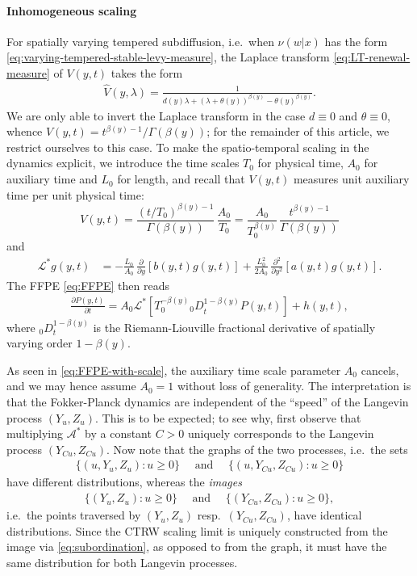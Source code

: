 \documentclass[a4paper,12pt]{elsarticle}
\numberwithin{equation}{section}
\theoremstyle{plain}
\theoremstyle{definition}
\theoremstyle{remark}
\numberwithin{equation}{section}
\newcommand{\1}{\mathbf 1}
\newcommand{\del}{\partial}
\begin{document}
\paragraph{Inhomogeneous scaling}
For spatially varying tempered subdiffusion, i.e.\ when $\nu(w|x)$ has the form 
\eqref{eq:varying-tempered-stable-levy-measure}, 
the Laplace transform \eqref{eq:LT-renewal-measure} of $V(y,t)$ takes the form
\begin{align}
\hat V(y,\lambda) =
\frac{1}{d(y) \lambda + (\lambda + \theta(y))^{\beta(y)} - \theta(y)^{\beta(y)}}.
\end{align}
We are only able to invert the Laplace transform in the case $d \equiv 0$ and
$\theta \equiv 0$, whence $V(y,t) = t^{\beta(y)-1} / \Gamma(\beta(y))$; 
for the remainder of this article, we restrict ourselves to this case.
To make the spatio-temporal scaling in the dynamics explicit, we introduce the time scales
$T_0$ for physical time, $A_0$ for auxiliary time and $L_0$ for length, 
and recall that $V(y,t)$ measures unit auxiliary time per unit physical 
time:
$$V(y,t) = \frac{(t/T_0)^{\beta(y)-1}}{\Gamma(\beta(y))}\, \frac{A_0}{T_0}
= \frac{A_0}{T_0^{\beta(y)}} \, \frac{t^{\beta(y) - 1}}{\Gamma(\beta(y))}$$
and
\begin{align}
\mathcal L^* g(y,t)
&= -\frac{L_0}{A_0}\,\frac{\partial }{\partial y}[b(y,t) g(y,t)]
+\frac{L_0^2}{2A_0}\,\frac{\partial^2 }{\partial y^2}[a(y,t) g(y,t)].
\end{align}
The FFPE \eqref{eq:FFPE} then reads
\begin{align} \label{eq:FFPE-with-scale}
\frac{\del P(y,t)}{\del t}
= A_0 \mathcal L^* \left[ T_0^{-\beta(y)} {_0 D}_t^{1-\beta(y)} P(y,t) \right] + h(y,t),
\end{align}
where $_0 D_t^{1-\beta(y)}$ is the Riemann-Liouville
fractional derivative of spatially varying order $1-\beta(y)$.

As seen in \eqref{eq:FFPE-with-scale}, the auxiliary time scale parameter $A_0$ cancels, and we may hence assume $A_0 = 1$ without loss of generality. The interpretation is that the
Fokker-Planck dynamics are independent of the ``speed'' of the Langevin process
$(Y_u, Z_u)$.  This is to be expected; to see why, first observe that
multiplying $\mathcal A^*$ by a constant $C > 0$ uniquely corresponds to the
Langevin process $(Y_{Cu}, Z_{Cu})$. 
Now note that the graphs of the two processes, i.e.\ the sets
\begin{align*}
\{(u, Y_u, Z_u): u \ge 0\} \quad \text{ and } \quad 
\{(u, Y_{Cu}, Z_{Cu}): u \ge 0\}
\end{align*}
have different distributions, whereas the \emph{images}
\begin{align*}
\{(Y_u, Z_u): u \ge 0\} \quad \text{ and } \quad 
\{(Y_{Cu}, Z_{Cu}): u \ge 0\},
\end{align*}
i.e.\ the points traversed by $(Y_u,Z_u)$ resp.\ $(Y_{Cu}, Z_{Cu})$, 
have identical distributions. 
Since the CTRW scaling limit is uniquely constructed from the image via 
\eqref{eq:subordination},
as opposed to from the graph,
it must have the same distribution for both Langevin processes.
\end{document}
